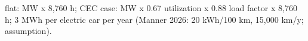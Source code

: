 \parbox{\textwidth}{\footnotesize flat: MW x 8,760 h; CEC case: MW x 0.67 utilization x 0.88 load factor x 8,760 h; 3 MWh per electric car per year (Manner 2026: 20 kWh/100 km, 15,000 km/y; assumption).}